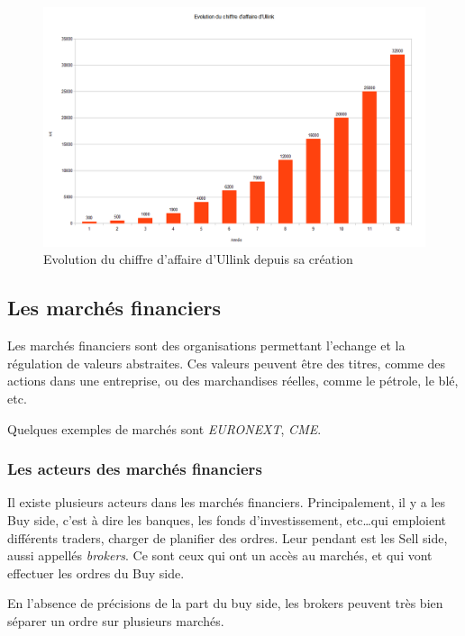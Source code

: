 \documentclass[a4paper, 12pt]{article}
\begin{document}
\begin{figure}
\includegraphics[width=\textwidth]{ca_ullink.png}
\caption{Evolution du chiffre d'affaire d'Ullink depuis sa création}
\label{ca_ullink}
\end{figure}

\subsection{Les marchés financiers}

Les marchés financiers sont des organisations permettant l'echange et la régulation de valeurs abstraites. Ces valeurs peuvent être des titres, comme des actions dans une entreprise, ou des marchandises réelles, comme le pétrole, le blé, etc.

Quelques exemples de marchés sont \emph{EURONEXT}, \emph{CME}.

\subsubsection{Les acteurs des marchés financiers}

Il existe plusieurs acteurs dans les marchés financiers. Principalement, il y a les Buy side, c'est à dire les banques, les fonds d'investissement, etc\dots  qui emploient différents traders, charger de planifier des ordres. Leur pendant est les Sell side, aussi appellés \emph{brokers}. Ce sont ceux qui ont un accès au marchés, et qui vont effectuer les ordres du Buy side.

En l'absence de précisions de la part du buy side, les brokers peuvent très bien séparer un ordre sur plusieurs marchés.
\end{document}
